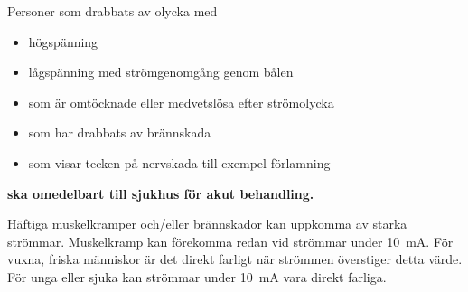
\bigskip
\noindent
\begin{minipage}{0.19\columnwidth}
\Huge{\selectfont{}\relax}
\end{minipage}
\begin{minipage}{0.7\columnwidth}
Personer som drabbats av olycka med
\begin{itemize}
\item högspänning
\item lågspänning med strömgenomgång genom bålen
\item som är omtöcknade eller medvetslösa efter strömolycka
\item som har drabbats av brännskada
\item som visar tecken på nervskada till exempel förlamning
\end{itemize}
\textbf{ska omedelbart till sjukhus för akut behandling.}
\end{minipage}

\vspace{1ex}
Häftiga muskelkramper och/eller brännskador kan uppkomma av starka strömmar.
Muskelkramp kan förekomma redan vid strömmar under \qty{10}{\milli\ampere}.
För vuxna, friska människor är det direkt farligt när strömmen överstiger
detta värde.
För unga eller sjuka kan strömmar under \qty{10}{\milli\ampere} vara direkt
farliga.

